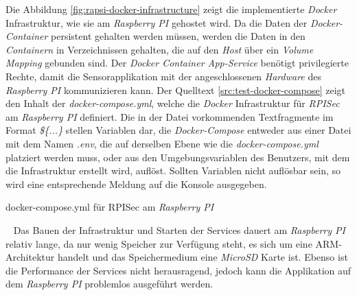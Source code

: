 Die Abbildung \ref{fig:rapsi-docker-infrastructure} zeigt die implementierte \emph{Docker} Infrastruktur, wie sie am \emph{Raspberry PI} gehostet wird. Da die Daten der \emph{Docker-Container} persistent gehalten werden müssen, werden die Daten in den \emph{Containern} in Verzeichnissen gehalten, die auf den \emph{Host} über ein \emph{Volume Mapping} gebunden sind. Der \emph{Docker Container App-Service} benötigt privilegierte Rechte, damit die Sensorapplikation mit der angeschlossenen \emph{Hardware} des \emph{Raspberry PI} kommunizieren kann. 
\newline
\newline
Der Quelltext \ref{src:test-docker-compose} zeigt den Inhalt der \emph{docker-compose.yml}, welche die \emph{Docker} Infrastruktur für \emph{RPISec} am \emph{Raspberry PI} definiert. Die in der Datei vorkommenden Textfragmente im Format \emph{\$\{...\}} stellen Variablen dar, die \emph{Docker-Compose} entweder aus einer Datei mit dem Namen \emph{.env}, die auf derselben Ebene wie die \emph{docker-compose.yml} platziert werden muss, oder aus den Umgebungsvariablen des Benutzers, mit dem die Infrastruktur erstellt wird, auflöst. Sollten Variablen nicht auflösbar sein, so wird eine entsprechende Meldung auf die Konsole ausgegeben.
\begin{code}
	\caption{docker-compose.yml für RPISec am \emph{Raspberry PI}}
	\label{src:test-docker-compose}
\end{code}
\ \newline
Das Bauen der Infrastruktur und Starten der Services dauert am \emph{Raspberry PI} relativ lange, da nur wenig Speicher zur Verfügung steht, es sich um eine ARM-Architektur handelt und das Speichermedium eine \emph{MicroSD} Karte ist. Ebenso ist die Performance der Services nicht herausragend, jedoch kann die Applikation auf dem \emph{Raspberry PI} problemlos ausgeführt werden.  